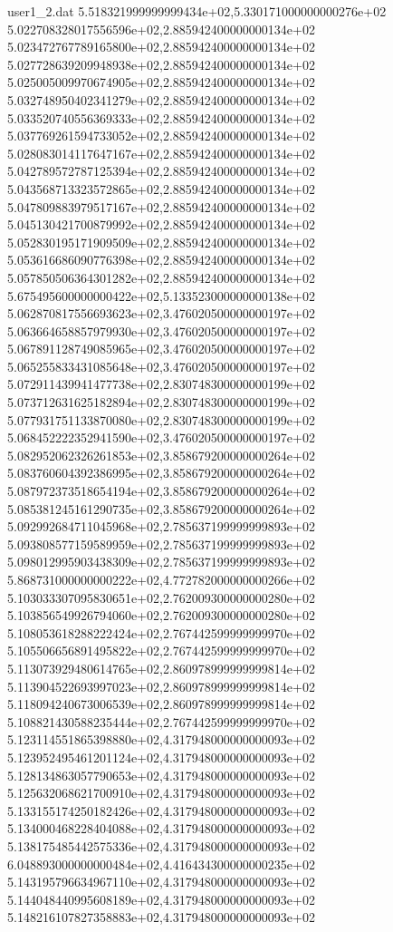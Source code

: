 \begin{filecontents}{user1_2.dat}
5.518321999999999434e+02,5.330171000000000276e+02
5.022708328017556596e+02,2.885942400000000134e+02
5.023472767789165800e+02,2.885942400000000134e+02
5.027728639209948938e+02,2.885942400000000134e+02
5.025005009970674905e+02,2.885942400000000134e+02
5.032748950402341279e+02,2.885942400000000134e+02
5.033520740556369333e+02,2.885942400000000134e+02
5.037769261594733052e+02,2.885942400000000134e+02
5.028083014117647167e+02,2.885942400000000134e+02
5.042789572787125394e+02,2.885942400000000134e+02
5.043568713323572865e+02,2.885942400000000134e+02
5.047809883979517167e+02,2.885942400000000134e+02
5.045130421700879992e+02,2.885942400000000134e+02
5.052830195171909509e+02,2.885942400000000134e+02
5.053616686090776398e+02,2.885942400000000134e+02
5.057850506364301282e+02,2.885942400000000134e+02
5.675495600000000422e+02,5.133523000000000138e+02
5.062870817556693623e+02,3.476020500000000197e+02
5.063664658857979930e+02,3.476020500000000197e+02
5.067891128749085965e+02,3.476020500000000197e+02
5.065255833431085648e+02,3.476020500000000197e+02
5.072911439941477738e+02,2.830748300000000199e+02
5.073712631625182894e+02,2.830748300000000199e+02
5.077931751133870080e+02,2.830748300000000199e+02
5.068452222352941590e+02,3.476020500000000197e+02
5.082952062326261853e+02,3.858679200000000264e+02
5.083760604392386995e+02,3.858679200000000264e+02
5.087972373518654194e+02,3.858679200000000264e+02
5.085381245161290735e+02,3.858679200000000264e+02
5.092992684711045968e+02,2.785637199999999893e+02
5.093808577159589959e+02,2.785637199999999893e+02
5.098012995903438309e+02,2.785637199999999893e+02
5.868731000000000222e+02,4.772782000000000266e+02
5.103033307095830651e+02,2.762009300000000280e+02
5.103856549926794060e+02,2.762009300000000280e+02
5.108053618288222424e+02,2.767442599999999970e+02
5.105506656891495822e+02,2.767442599999999970e+02
5.113073929480614765e+02,2.860978999999999814e+02
5.113904522693997023e+02,2.860978999999999814e+02
5.118094240673006539e+02,2.860978999999999814e+02
5.108821430588235444e+02,2.767442599999999970e+02
5.123114551865398880e+02,4.317948000000000093e+02
5.123952495461201124e+02,4.317948000000000093e+02
5.128134863057790653e+02,4.317948000000000093e+02
5.125632068621700910e+02,4.317948000000000093e+02
5.133155174250182426e+02,4.317948000000000093e+02
5.134000468228404088e+02,4.317948000000000093e+02
5.138175485442575336e+02,4.317948000000000093e+02
6.048893000000000484e+02,4.416434300000000235e+02
5.143195796634967110e+02,4.317948000000000093e+02
5.144048440995608189e+02,4.317948000000000093e+02
5.148216107827358883e+02,4.317948000000000093e+02

\end{filecontents}
